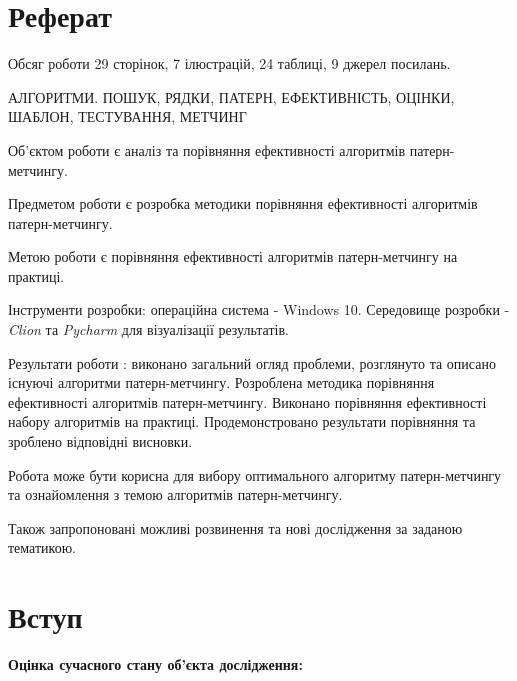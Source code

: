\documentclass[a4paper,14pt]{extarticle} %
\begin{document}
	
	\newpage

	\section*{Реферат}

	Обсяг роботи 29 сторінок, 7 ілюстрацій, 24 таблиці, 9 джерел посилань.

	АЛГОРИТМИ. ПОШУК, РЯДКИ, ПАТЕРН,
	ЕФЕКТИВНІСТЬ, ОЦІНКИ, ШАБЛОН, ТЕСТУВАННЯ, МЕТЧИНГ

	Об'єктом роботи є аналіз та порівняння ефективності алгоритмів патерн-метчингу.
	
	Предметом роботи є розробка методики порівняння ефективності алгоритмів патерн-метчингу.

	Метою роботи є порівняння ефективності алгоритмів патерн-метчингу на практиці. 

	Інструменти розробки: операційна система - Windows 10. Середовище розробки - \textit{Clion} та \textit{Pycharm} для візуалізації результатів.

	Результати роботи : виконано загальний огляд проблеми, розглянуто та описано існуючі алгоритми патерн-метчингу.
	Розроблена методика порівняння ефективності алгоритмів патерн-метчингу. Виконано порівняння ефективності набору алгоритмів на практиці.
	Продемонстровано результати порівняння та зроблено відповідні висновки.

	Робота може бути корисна для вибору оптимального алгоритму патерн-метчингу та ознайомлення з темою алгоритмів патерн-метчингу.

	Також запропоновані можливі розвинення та нові дослідження за заданою тематикою.

	\newpage

    \tableofcontents


    \newpage
    
    \section*{Вступ}

	\textbf{Оцінка сучасного стану об’єкта дослідження:}
	
\end{document}
